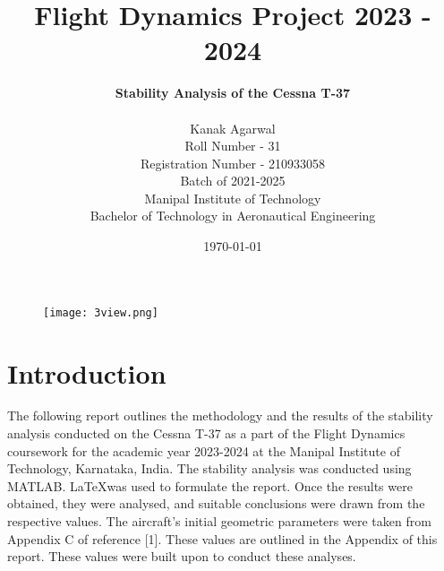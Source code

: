 \documentclass[letterpaper,12pt]{article}
\begin{document}
\title{\textbf{Flight Dynamics Project 2023 - 2024}}
\author{\textbf{\Large Stability Analysis of the Cessna T-37}\\ \vspace{3mm}
\begin{minipage}[t]{1\textwidth}
\begin{center}
\vspace{3mm}
\Large Kanak Agarwal \\ 
\vspace{5mm} 
\large Roll Number - 31\\
\vspace{0.5mm}
Registration Number - 210933058\\  
\vspace{5mm}
Batch of 2021-2025 \\
\vspace{0.5mm}
Manipal Institute of Technology\\ 
\vspace{0.5mm}
Bachelor of Technology in Aeronautical Engineering
\end{center}
\end{minipage}}
\date{\vspace{10pt}\today}
\begin{figure}[H]
\begin{center}
\texttt{[image: 3view.png]}
\vspace{1cm}
\break\maketitle
\end{center}
\end{figure}
\newpage
\tableofcontents
\thispagestyle{empty}
\newpage
{}
\section{Introduction}
The following report outlines the methodology and the results of the stability analysis conducted on the Cessna T-37 as a part of the Flight Dynamics coursework for the academic year 2023-2024 at the Manipal Institute of Technology, Karnataka, India. \vspace{7pt}
\newline
The stability analysis was conducted using MATLAB. \LaTeX \hspace{3pt}was used to formulate the report. Once the results were obtained, they were analysed, and suitable conclusions were drawn from the respective values.\vspace{7pt}\newline
The aircraft's initial geometric parameters were taken from Appendix C of reference [1]. These values are outlined in the Appendix of this report. These values were built upon to conduct these analyses.
\end{document}
